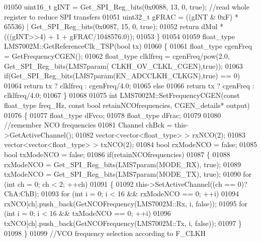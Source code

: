 \begin{DoxyCode}
{{{{{{{{{{{{{{{{{{{{{{{{{01050     uint16\_t gINT = Get_SPI_Reg_bits(0x0088, 13, 0, \textcolor{keyword}{true}); \textcolor{comment}{//read whole register to reduce SPI transfers}
01051     uint32\_t gFRAC = ((gINT & 0xF) * 65536) | Get_SPI_Reg_bits(0x0087, 15, 0, \textcolor{keyword}{true});
01052     \textcolor{keywordflow}{return} dMul * (((gINT>>4) + 1 + gFRAC/1048576.0));
01053 \}
01054 
01059 float_type LMS7002M::GetReferenceClk_TSP(\textcolor{keywordtype}{bool} tx)
01060 \{
01061     float_type cgenFreq = GetFrequencyCGEN();
01062     float_type clklfreq = cgenFreq/pow(2.0, Get_SPI_Reg_bits(LMS7param(
      CLKH_OV_CLKL_CGEN),\textcolor{keyword}{true}));
01063     \textcolor{keywordflow}{if}(Get_SPI_Reg_bits(LMS7param(EN_ADCCLKH_CLKGN),\textcolor{keyword}{true}) == 0)
01064         \textcolor{keywordflow}{return} tx ? clklfreq : cgenFreq/4.0;
01065     \textcolor{keywordflow}{else}
01066         \textcolor{keywordflow}{return} tx ? cgenFreq : clklfreq/4.0;
01067 \}
01068 
01075 \textcolor{keywordtype}{int} LMS7002M::SetFrequencyCGEN(\textcolor{keyword}{const} float_type freq\_Hz, \textcolor{keyword}{const} \textcolor{keywordtype}{bool} retainNCOfrequencies, 
      CGEN_details* output)
01076 \{
01077     float_type dFvco;
01078     float_type dFrac;
01079 
01080     \textcolor{comment}{//remember NCO frequencies}
01081     Channel chBck = this->GetActiveChannel();
01082     vector<vector<float\_type> > rxNCO(2);
01083     vector<vector<float\_type> > txNCO(2);
01084     \textcolor{keywordtype}{bool} rxModeNCO = \textcolor{keyword}{false};
01085     \textcolor{keywordtype}{bool} txModeNCO = \textcolor{keyword}{false};
01086     \textcolor{keywordflow}{if}(retainNCOfrequencies)
01087     \{
01088         rxModeNCO = Get_SPI_Reg_bits(LMS7param(MODE_RX), \textcolor{keyword}{true});
01089         txModeNCO = Get_SPI_Reg_bits(LMS7param(MODE_TX), \textcolor{keyword}{true});
01090         \textcolor{keywordflow}{for} (\textcolor{keywordtype}{int} ch = 0; ch < 2; ++ch)
01091         \{
01092             this->SetActiveChannel((ch == 0)?ChA:ChB);
01093             \textcolor{keywordflow}{for} (\textcolor{keywordtype}{int} i = 0; i < 16 && rxModeNCO == 0; ++i)
01094                 rxNCO[ch].push\_back(GetNCOFrequency(LMS7002M::Rx, i, \textcolor{keyword}{false}));
01095             \textcolor{keywordflow}{for} (\textcolor{keywordtype}{int} i = 0; i < 16 && txModeNCO == 0; ++i)
01096                 txNCO[ch].push\_back(GetNCOFrequency(LMS7002M::Tx, i, \textcolor{keyword}{false}));
01097         \}
01098     \}
01099     \textcolor{comment}{//VCO frequency selection according to F\_CLKH}
}}}}}}}}}}}}}}}}}}}}}}}}}
\end{DoxyCode}
